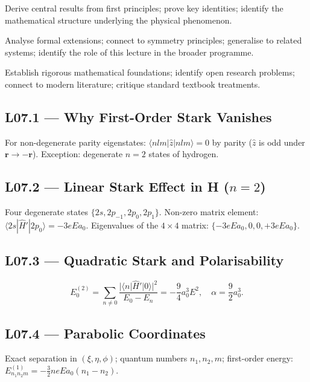 \quad
Derive central results from first principles; prove key identities; identify
the mathematical structure underlying the physical phenomenon.

\quad
Analyse formal extensions; connect to symmetry principles; generalise to
related systems; identify the role of this lecture in the broader programme.

\quad
Establish rigorous mathematical foundations; identify open research problems;
connect to modern literature; critique standard textbook treatments.


\subsection*{L07.1 — Why First-Order Stark Vanishes}
For non-degenerate parity eigenstates: $\langle nlm|\hat{z}|nlm\rangle = 0$
by parity ($\hat{z}$ is odd under $\mathbf{r}\to-\mathbf{r}$).
Exception: degenerate $n=2$ states of hydrogen.

\subsection*{L07.2 — Linear Stark Effect in H ($n=2$)}
Four degenerate states $\{2s,2p_{-1},2p_0,2p_1\}$.
Non-zero matrix element: $\langle 2s|\hat{H}'|2p_0\rangle = -3eEa_0$.
Eigenvalues of the $4\times4$ matrix: $\{-3eEa_0,0,0,+3eEa_0\}$.

\subsection*{L07.3 — Quadratic Stark and Polarisability}
\begin{tcolorbox}[lecturebox, title={Polarisability}]
\begin{equation}
  E^{(2)}_0 = \sum_{n\neq0}\frac{|\langle n|\hat{H}'|0\rangle|^2}{E_0-E_n}
  = -\frac{9}{4}a_0^3 E^2,
  \quad \alpha = \frac{9}{2}a_0^3.
  \label{eq:L07.1}
\end{equation}
\end{tcolorbox}

\subsection*{L07.4 — Parabolic Coordinates}
Exact separation in $(\xi,\eta,\phi)$; quantum numbers $n_1,n_2,m$;
first-order energy: $E^{(1)}_{n_1n_2m} = -\frac{3}{2}neEa_0(n_1-n_2)$.



